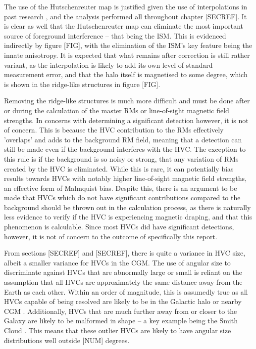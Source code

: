 The use of the Hutschenreuter map is justified given the use of interpolations in past research \citep{ID3, ID5, ID6, ID26, ID73}, and the analysis performed all throughout chapter [SECREF]. It is clear as well that the Hutschenreuter map can eliminate the most important source of foreground interference – that being the ISM. This is evidenced indirectly by figure [FIG], with the elimination of the ISM's key feature being the innate anisotropy. It is expected that what remains after correction is still rather variant, as the interpolation is likely to add its own level of standard measurement error, and that the halo itself is magnetised to some degree, which is shown in the ridge-like structures in figure [FIG].


Removing the ridge-like structures is much more difficult and must be done after or during the calculation of the master RMs or line-of-sight magnetic field strengths. In concerns with determining a significant detection however, it is not of concern. This is because the HVC contribution to the RMs effectively 'overlaps' and adds to the background RM field, meaning that a detection can still be made even if the background interferes with the HVC. The exception to this rule is if the background is so noisy or strong, that any variation of RMs created by the HVC is eliminated. While this is rare, it can potentially bias results towards HVCs with notably higher line-of-sight magnetic field strengths, an effective form of Malmquist bias. Despite this, there is an argument to be made that HVCs which do not have significant contributions compared to the background should be thrown out in the calculation process, as there is naturally less evidence to verify if the HVC is experiencing magnetic draping, and that this phenomenon is calculable. Since most HVCs did have significant detections, however, it is not of concern to the outcome of specifically this report.


From sections [SECREF] and [SECREF], there is quite a variance in HVC size, albeit a smaller variance for HVCs in the CGM. The use of angular size to discriminate against HVCs that are abnormally large or small is reliant on the assumption that all HVCs are approximately the same distance away from the Earth as each other. Within an order of magnitude, this is assumedly true as all HVCs capable of being resolved are likely to be in the Galactic halo or nearby CGM \citep{ID66, ID74}. Additionally, HVCs that are much further away from or closer to the Galaxy are likely to be malformed in shape \citep{ID66} – a key example being the Smith Cloud \citep{ID28, ID64}. This means that these outlier HVCs are likely to have angular size distributions well outside [NUM] degrees.


